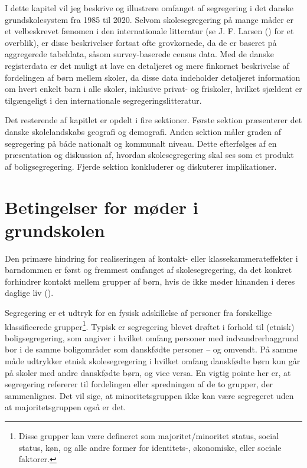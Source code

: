 \documentclass[
]{book}
\begin{document}
I dette kapitel vil jeg beskrive og illustrere omfanget af segregering i det danske grundskolesystem fra 1985 til 2020. Selvom skolesegregering på mange måder er et velbeskrevet fænomen i den internationale litteratur (se J. F. Larsen () for et overblik), er disse beskrivelser fortsat ofte grovkornede, da de er baseret på aggregerede tabeldata, såsom survey-baserede census data. Med de danske registerdata er det muligt at lave en detaljeret og mere finkornet beskrivelse af fordelingen af børn mellem skoler, da disse data indeholder detaljeret information om hvert enkelt barn i alle skoler, inklusive privat- og friskoler, hvilket sjældent er tilgængeligt i den internationale segregeringslitteratur.

Det resterende af kapitlet er opdelt i fire sektioner. Første sektion præsenterer det danske skolelandskabs geografi og demografi. Anden sektion måler graden af segregering på både nationalt og kommunalt niveau. Dette efterfølges af en præsentation og diskussion af, hvordan skolesegregering skal ses som et produkt af boligsegregering. Fjerde sektion konkluderer og diskuterer implikationer.

\section{Betingelser for møder i grundskolen}\label{betingelser-for-muxf8der-i-grundskolen}

Den primære hindring for realiseringen af kontakt- eller klassekammerateffekter i barndommen er først og fremmest omfanget af skolesegregering, da det konkret forhindrer kontakt mellem grupper af børn, hvis de ikke møder hinanden i deres daglige liv ().

Segregering er et udtryk for en fysisk adskillelse af personer fra forskellige klassificerede grupper\footnote{Disse grupper kan være defineret som majoritet/minoritet status, social status, køn, og alle andre former for identitets-, økonomiske, eller sociale faktorer.}. Typisk er segregering blevet drøftet i forhold til (etnisk) boligsegregering, som angiver i hvilket omfang personer med indvandrerbaggrund bor i de samme boligområder som danskfødte personer -- og omvendt. På samme måde udtrykker etnisk skolesegregering i hvilket omfang danskfødte børn kun går på skoler med andre danskfødte børn, og vice versa. En vigtig pointe her er, at segregering refererer til fordelingen eller spredningen af de to grupper, der sammenlignes. Det vil sige, at minoritetsgruppen ikke kan være segregeret uden at majoritetsgruppen også er det.
\end{document}
